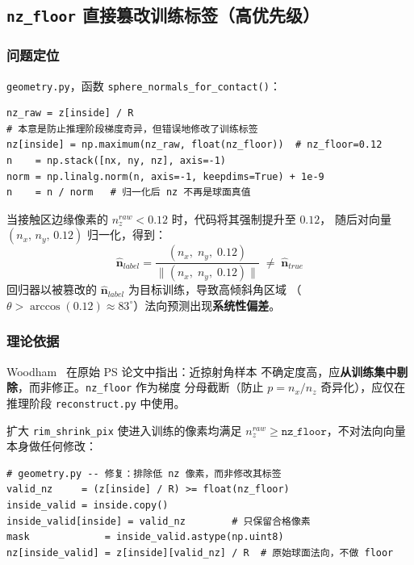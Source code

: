 \subsection{\texttt{nz\_floor} 直接篡改训练标签（高优先级）}
\label{subsec:nz_floor}

\subsubsection*{问题定位}

\texttt{geometry.py}，函数 \texttt{sphere\_normals\_for\_contact()}：

\begin{lstlisting}[caption={\texttt{nz\_floor} 对训练标签的错误应用}]
nz_raw = z[inside] / R
# 本意是防止推理阶段梯度奇异，但错误地修改了训练标签
nz[inside] = np.maximum(nz_raw, float(nz_floor))  # nz_floor=0.12
n    = np.stack([nx, ny, nz], axis=-1)
norm = np.linalg.norm(n, axis=-1, keepdims=True) + 1e-9
n    = n / norm   # 归一化后 nz 不再是球面真值
\end{lstlisting}

\begin{bugbox}
当接触区边缘像素的 $n_z^{raw} < 0.12$ 时，代码将其强制提升至 $0.12$，
随后对向量 $(n_x,\, n_y,\, 0.12)$ 归一化，得到：
\[
  \hat{\mathbf{n}}_{label}
  = \frac{(n_x,\; n_y,\; 0.12)}{\|(n_x,\; n_y,\; 0.12)\|}
  \;\neq\; \hat{\mathbf{n}}_{true}
\]
回归器以被篡改的 $\hat{\mathbf{n}}_{label}$ 为目标训练，导致高倾斜角区域
（$\theta > \arccos(0.12) \approx 83^\circ$）法向预测出现\textbf{系统性偏差}。
\end{bugbox}

\subsubsection*{理论依据}

Woodham~\cite{woodham1980photometric} 在原始 PS 论文中指出：近掠射角样本
不确定度高，应\textbf{从训练集中剔除}，而非修正。\texttt{nz\_floor} 作为梯度
分母截断（防止 $p = n_x/n_z$ 奇异化），应仅在推理阶段 \texttt{reconstruct.py}
中使用。

\begin{fixbox}
扩大 \texttt{rim\_shrink\_pix} 使进入训练的像素均满足
$n_z^{raw} \geq \texttt{nz\_floor}$，不对法向向量本身做任何修改：

\begin{lstlisting}
# geometry.py -- 修复：排除低 nz 像素，而非修改其标签
valid_nz     = (z[inside] / R) >= float(nz_floor)
inside_valid = inside.copy()
inside_valid[inside] = valid_nz        # 只保留合格像素
mask             = inside_valid.astype(np.uint8)
nz[inside_valid] = z[inside][valid_nz] / R  # 原始球面法向，不做 floor
\end{lstlisting}
\end{fixbox}

